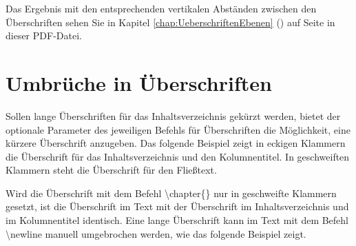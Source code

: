 Das Ergebnis mit den entsprechenden vertikalen Abständen zwischen den Überschriften sehen Sie in Kapitel \ref{chap:UeberschriftenEbenen} (\glqq {}\grqq{}) auf Seite \pageref{chap:UeberschriftenEbenen} in dieser PDF-Datei.





\section{Umbrüche in Überschriften}
\label{sec:Umbrueche in Ueberschriften}
Sollen lange Überschriften für das Inhaltsverzeichnis gekürzt werden, bietet der optionale Parameter des jeweiligen Befehls für Überschriften die Möglichkeit, eine kürzere Überschrift anzugeben. Das folgende Beispiel zeigt in eckigen Klammern die Überschrift für das Inhaltsverzeichnis und den Kolumnentitel. In geschweiften Klammern steht die Überschrift für den Fließtext. 


Wird die Überschrift mit dem Befehl \glqq \textbackslash chapter\{\}\grqq{} nur in geschweifte Klammern gesetzt, ist die Überschrift im Text mit der Überschrift im Inhaltsverzeichnis und im Kolumnentitel identisch. Eine lange Überschrift kann im Text mit dem Befehl \glqq \textbackslash newline\grqq{} manuell umgebrochen werden, wie das folgende Beispiel zeigt.




